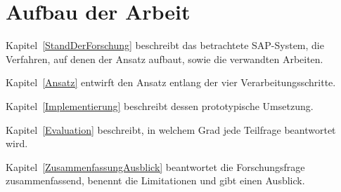 \section{Aufbau der Arbeit}
\label{sec:aufbau}
 
Kapitel~\ref{StandDerForschung} beschreibt das betrachtete SAP-System, die Verfahren, auf denen der Ansatz aufbaut, sowie die verwandten Arbeiten.

Kapitel~\ref{Ansatz} entwirft den Ansatz entlang der vier Verarbeitungsschritte. 

Kapitel~\ref{Implementierung} beschreibt dessen prototypische Umsetzung.

Kapitel~\ref{Evaluation} beschreibt, in welchem Grad jede Teilfrage beantwortet wird. 

Kapitel~\ref{ZusammenfassungAusblick} beantwortet die Forschungsfrage zusammenfassend, benennt die Limitationen und gibt einen Ausblick.
 
